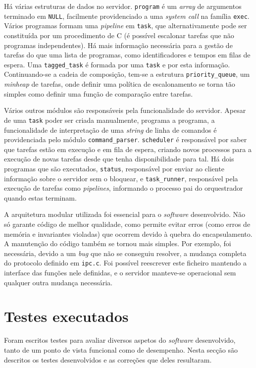 \documentclass[11pt]{article}
\begin{document}
Há várias estruturas de dados no servidor. \texttt{program} é um \emph{array} de argumentos
terminado em \texttt{NULL}, facilmente providenciado a uma \emph{system call} na família
\texttt{exec}. Vários programas formam uma \emph{pipeline} em \texttt{task}, que alternativamente
pode ser constituída por um procedimento de C (é possível escalonar tarefas que não programas
independentes). Há mais informação necessária para a gestão de tarefas do que uma lista de
programas, como identificadores e tempos em filas de espera. Uma \texttt{tagged\_task} é formada por
uma \texttt{task} e por esta informação. Continuando-se a cadeia de composição, tem-se a estrutura
\texttt{priority\_queue}, um \emph{minheap} de tarefas, onde definir uma política de escalonamento
se torna tão simples como definir uma função de comparação entre tarefas.

Vários outros módulos são responsáveis pela funcionalidade do servidor. Apesar de uma \texttt{task}
poder ser criada manualmente, programa a programa, a funcionalidade de interpretação de uma
\emph{string} de linha de comandos é providenciada pelo módulo \texttt{command\_parser}.
\texttt{scheduler} é responsável por saber que tarefas estão em execução e em fila de espera,
criando novos processos para a execução de novas tarefas desde que tenha disponibilidade para tal.
Há dois programas que são executados, \texttt{status}, responsável por enviar ao cliente informação
sobre o servidor sem o bloquear, e \texttt{task\_runner}, responsável pela execução de tarefas
como \emph{pipelines}, informando o processo pai do orquestrador quando estas terminam.

A arquitetura modular utilizada foi essencial para o \emph{software} desenvolvido. Não só garante
código de melhor qualidade, como permite evitar erros (como erros de memória e invariantes violadas)
que ocorrem devido à quebra do encapsulamento. A manutenção do código também se tornou mais simples.
Por exemplo, foi necessária, devido a um \emph{bug} que não se conseguiu resolver, a mudança
completa do protocolo definido em \texttt{ipc.c}. Foi possível reescrever este ficheiro mantendo a
interface das funções nele definidas, e o servidor manteve-se operacional sem qualquer outra mudança
necessária.

\section{Testes executados}

Foram escritos testes para avaliar diversos aspetos do \emph{software} desenvolvido, tanto de um
ponto de vista funcional como de desempenho. Nesta secção são descritos os testes desenvolvidos e
as correções que deles resultaram.
\end{document}
